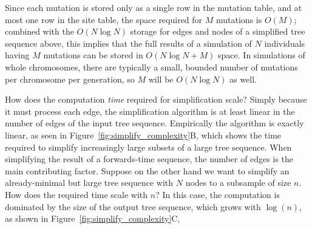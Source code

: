 \documentclass{article}
\begin{document}
Since each mutation is stored only as a single row in the mutation table,
and at most one row in the site table, the space required for $M$ mutations is $O(M)$;
combined with the $O(N \log N)$ storage for edges and nodes of a simplified tree sequence above,
this implies that the full results of a simulation of $N$ individuals
having $M$ mutations can be stored in $O(N \log N + M)$ space.
In simulations of whole chromosomes, there are typically a small, bounded number of mutations per chromosome per generation,
so $M$ will be $O(N \log N)$ as well.

How does the computation \emph{time} required for simplification scale?
Simply because it must process each edge,
the simplification algorithm is at least linear in the number of edges of the input tree sequence.
Empirically the algorithm is exactly linear,
as seen in Figure~\ref{fig:simplify_complexity}B,
which shows the time required to simplify increasingly large subsets of a large tree sequence.
When simplifying the result of a forwards-time sequence, the number of edges is the main contributing factor.
Suppose on the other hand we want to
simplify an already-minimal but large tree sequence with $N$ nodes
to a subsample of size $n$.
How does the required time scale with $n$?
In this case, the computation is dominated by the size of the output tree sequence,
which grows with $\log(n)$, as shown in Figure~\ref{fig:simplify_complexity}C,


\end{document}
